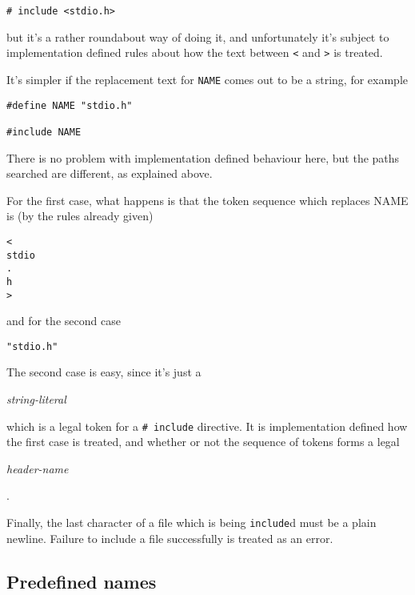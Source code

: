    \begin{Verbatim}
# include <stdio.h>
\end{Verbatim}

   but it's a rather roundabout way of doing it, and unfortunately it's
    subject to implementation defined rules about how the text
    between \texttt{<} and \texttt{>} is
    treated.


   It's simpler if the replacement text for \texttt{NAME} comes out
    to be a string, for example


   \begin{Verbatim}
#define NAME "stdio.h"

#include NAME
\end{Verbatim}

   There is no problem with implementation defined behaviour here, but
    the paths searched are different, as explained above.


   For the first case, what happens is that the token sequence which
    replaces NAME is (by the rules already given)


   \begin{Verbatim}
<
stdio
.
h
>
\end{Verbatim}

   and for the second case


   \begin{Verbatim}
"stdio.h"
\end{Verbatim}

   The second case is easy, since it's just a \begin{center}\textit{string-literal}\end{center}

    which is a legal token for a \texttt{\# include} directive. It is
    implementation defined how the first case is treated, and whether or not
    the sequence of tokens forms a legal \begin{center}\textit{header-name}\end{center}

.


   Finally, the last character of a file which is being
    \texttt{include}d must be a plain newline. Failure to include a file
    successfully is treated as an error.


  

  \subsection{Predefined names}
   

